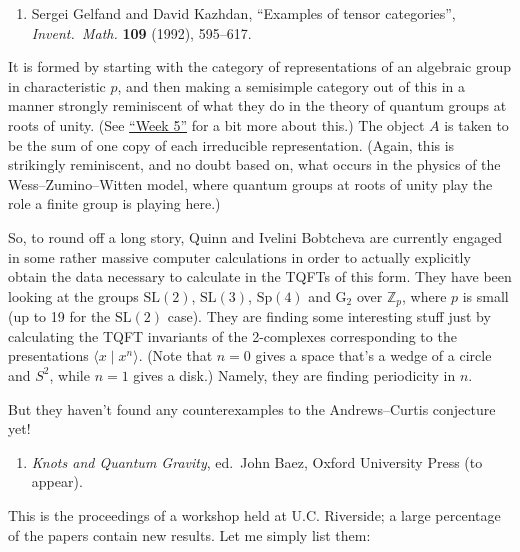 \documentclass{article}
\def\tightlist{}
\begin{document}
\begin{enumerate}
\def\labelenumi{\arabic{enumi})}
\setcounter{enumi}{4}
\tightlist
\item
  Sergei Gelfand and David Kazhdan, ``Examples of tensor categories'',
  \emph{Invent.\ Math.} \textbf{109} (1992), 595--617.
\end{enumerate}

It is formed by starting with the category of representations of an
algebraic group in characteristic \(p\), and then making a semisimple
category out of this in a manner strongly reminiscent of what they do in
the theory of quantum groups at roots of unity. (See
\protect\hyperlink{week5}{``Week 5''} for a bit more about this.) The
object \(A\) is taken to be the sum of one copy of each irreducible
representation. (Again, this is strikingly reminiscent, and no doubt
based on, what occurs in the physics of the Wess--Zumino--Witten model,
where quantum groups at roots of unity play the role a finite group is
playing here.)

So, to round off a long story, Quinn and Ivelini Bobtcheva are currently
engaged in some rather massive computer calculations in order to
actually explicitly obtain the data necessary to calculate in the TQFTs
of this form. They have been looking at the groups \(\mathrm{SL}(2)\),
\(\mathrm{SL}(3)\), \(\mathrm{Sp}(4)\) and \(\mathrm{G}_2\) over
\(\mathbb{Z}_p\), where \(p\) is small (up to 19 for the
\(\mathrm{SL}(2)\) case). They are finding some interesting stuff just
by calculating the TQFT invariants of the 2-complexes corresponding to
the presentations \(\langle x \mid x^n \rangle\). (Note that \(n = 0\)
gives a space that's a wedge of a circle and \(S^2\), while \(n = 1\)
gives a disk.) Namely, they are finding periodicity in \(n\).

But they haven't found any counterexamples to the Andrews--Curtis
conjecture yet!

\begin{enumerate}
\def\labelenumi{\arabic{enumi})}
\setcounter{enumi}{5}
\tightlist
\item
  \emph{Knots and Quantum Gravity}, ed.~John Baez, Oxford University
  Press (to appear).
\end{enumerate}

This is the proceedings of a workshop held at U.C. Riverside; a large
percentage of the papers contain new results. Let me simply list them:
\end{document}
